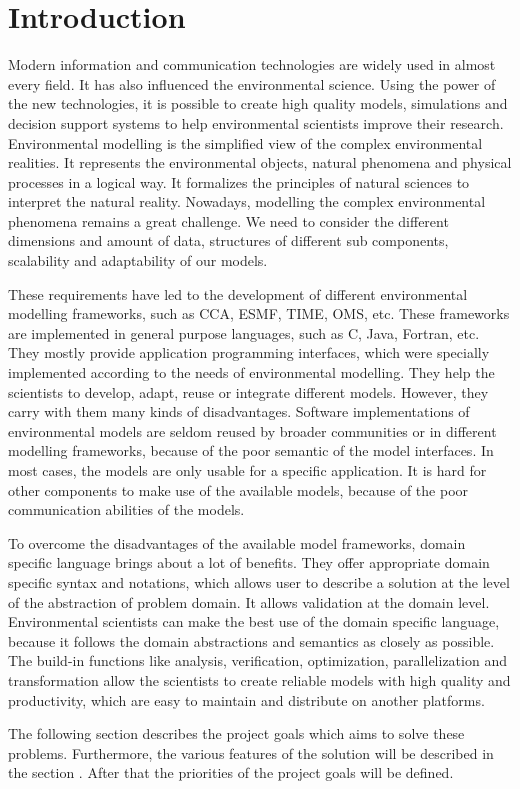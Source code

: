 \chapter{Introduction} \label{chap:introduction}
\par
Modern information and communication technologies are widely used in almost every field.  It has also influenced the environmental science. Using the power of the new technologies, it is possible to create high quality models, simulations and decision support systems to help environmental scientists improve their research. Environmental modelling is the simplified view of the complex environmental realities. It represents the environmental objects, natural phenomena and physical processes in a logical way. It formalizes the principles of natural sciences to interpret the natural reality. Nowadays, modelling the complex environmental phenomena remains a great challenge. We need to consider the different dimensions and amount of data, structures of different sub components, scalability and adaptability of our models.
\par
These requirements have led to the development of different environmental modelling frameworks, such as CCA, ESMF, TIME, OMS, etc. These frameworks are implemented in general purpose languages, such as C, Java, Fortran, etc. They mostly provide application programming interfaces, which were specially implemented according to the needs of environmental modelling. They help the scientists to develop, adapt, reuse or integrate different models. However, they carry with them many kinds of disadvantages. Software implementations of environmental models are seldom reused by broader communities or in different modelling frameworks, because of the poor semantic of the model interfaces. In most cases, the models are only usable for a specific application. It is hard for other components to make use of the available models, because of the poor communication abilities of the models.
\par
To overcome the disadvantages of the available model frameworks, domain specific language brings about a lot of benefits. They offer appropriate domain specific syntax and notations, which allows user to describe a solution at the level of the abstraction of problem domain. It allows validation at the domain level. Environmental scientists can make the best use of the domain specific language, because it follows the domain abstractions and semantics as closely as possible. The build-in functions like analysis, verification, optimization, parallelization and  transformation allow the scientists to create reliable models with high quality and productivity, which are easy to maintain and distribute on another platforms.
\par
The following section describes the project goals which aims to solve these problems. Furthermore, the various features of the solution will be described in the section . After that the priorities of the project goals will be defined.

